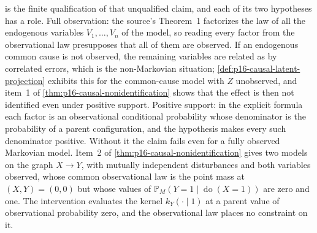  is the finite qualification
of that unqualified claim, and each of its two hypotheses has a role.
Full observation: the source's Theorem~1 factorizes the law of all the
endogenous variables \(V_1,\ldots,V_n\) of the model, so reading every
factor from the observational law presupposes that all of them are
observed. If an endogenous common cause is not observed, the remaining
variables are related as by correlated errors, which is the non-Markovian
situation; \cref{def:p16-causal-latent-projection} exhibits this for the
common-cause model with \(Z\) unobserved, and item~1 of
\cref{thm:p16-causal-nonidentification} shows that the effect is then not
identified even under positive support. Positive support: in the explicit
formula each factor is an observational conditional probability whose
denominator is the probability of a parent configuration, and the
hypothesis makes every such denominator positive. Without it the claim
fails even for a fully observed Markovian model. Item~2 of
\cref{thm:p16-causal-nonidentification} gives two models on the graph
\(X\to Y\), with mutually independent disturbances and both variables
observed, whose common observational law is the point mass at
\((X,Y)=(0,0)\) but whose values of
\(\mathbb P_M(Y=1\mid\operatorname{do}(X=1))\) are zero and one. The
intervention evaluates the kernel \(k_Y(\cdot\mid1)\) at a parent value of
observational probability zero, and the observational law places no
constraint on it.

